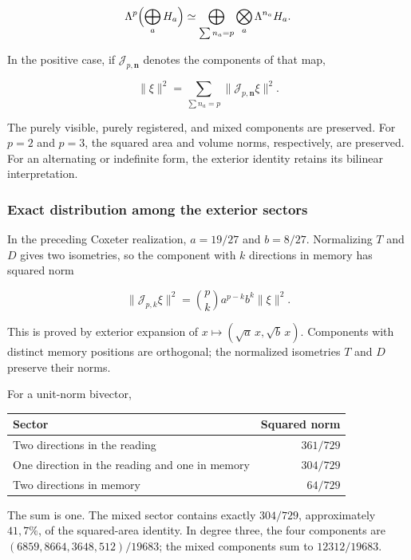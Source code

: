 \[
\Lambda^p\Bigl(\bigoplus_aH_a\Bigr)
\simeq\bigoplus_{\sum n_a=p}\bigotimes_a\Lambda^{n_a}H_a.
\]

In the positive case, if \(\mathcal J_{p,\mathbf n}\) denotes the components of that map,

\begin{equation}
\boxed{\|\xi\|^2=\sum_{\sum n_a=p}
\|\mathcal J_{p,\mathbf n}\xi\|^2.}
\label{nuc11:eq:21}
\end{equation}

The purely visible, purely registered, and mixed components are preserved. For \(p=2\) and \(p=3\), the squared area and volume norms, respectively, are preserved. For an alternating or indefinite form, the exterior identity retains its bilinear interpretation.

\subsubsection{Exact distribution among the exterior sectors}

In the preceding Coxeter realization, \(a=19/27\) and \(b=8/27\). Normalizing \(T\) and \(D\) gives two isometries, so the component with \(k\) directions in memory has squared norm

\begin{equation}
\boxed{
\|\mathcal J_{p,k}\xi\|^2=
\binom pk a^{p-k}b^k\|\xi\|^2.
}
\label{nuc11:eq:22}
\end{equation}

This is proved by exterior expansion of \(x\mapsto(\sqrt a\,x,\sqrt b\,x)\). Components with distinct memory positions are orthogonal; the normalized isometries \(T\) and \(D\) preserve their norms.

For a unit-norm bivector,

\begin{center}
\begin{tabular}{@{}lr@{}}
\toprule
Sector & Squared norm\\
\midrule
Two directions in the reading & \(361/729\)\\
One direction in the reading and one in memory & \(304/729\)\\
Two directions in memory & \(64/729\)\\
\bottomrule
\end{tabular}
\end{center}

The sum is one. The mixed sector contains exactly \(304/729\), approximately \(41{,}7\%\), of the squared-area identity. In degree three, the four components are \((6859,8664,3648,512)/19683\); the mixed components sum to \(12312/19683\).

